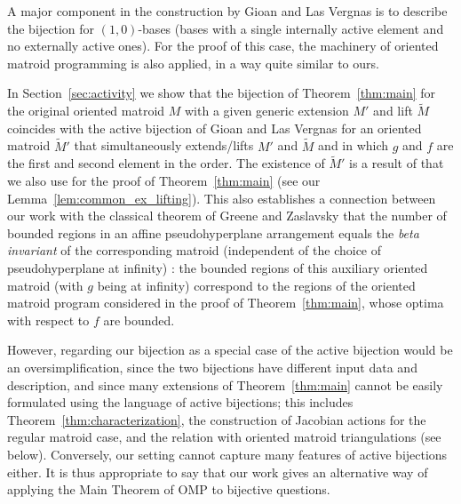 \documentclass[12pt]{amsart}
\numberwithin{equation}{section}
\theoremstyle{definition}
\newcommand{\Paco}[1]{\todo[size=\tiny,inline,color=orange!30]{#1 \\ \hfill --- P.}}
\newcommand{\Chiho}[1]{\todo[size=\tiny,inline,color=green!30]{#1 \\ \hfill --- Ch.}}
\begin{document}
A major component in the construction by Gioan and Las Vergnas is to describe  the bijection for $(1,0)$-bases (bases with a single internally active element and no externally active ones). For the proof of this case, the machinery of oriented matroid programming is also applied, in a way quite similar to ours.

In Section~\ref{sec:activity} we show that the bijection of Theorem~\ref{thm:main} for the original oriented matroid $M$ with a given generic extension $M'$ and lift $\widetilde M$ coincides with the active bijection of Gioan and Las Vergnas for an oriented matroid $\widetilde M'$ that simultaneously extends/lifts $M'$ and $\widetilde M$ and in which $g$ and $f$ are the first and second element in the order. The existence of $\widetilde M'$ is a result of \cite{Santos_book} that we also use for the proof of Theorem~\ref{thm:main} (see our Lemma~\ref{lem:common_ex_lifting}).
This also establishes a connection between our work with the classical theorem of Greene and Zaslavsky that the number of bounded regions in an affine pseudohyperplane arrangement equals the {\em beta invariant} of the corresponding matroid (independent of the choice of pseudohyperplane at infinity) \cite[Theorem D]{GZ_HPZono}: the bounded regions of this auxiliary oriented matroid (with $g$ being at infinity) correspond to the regions of the oriented matroid program considered in the proof of Theorem~\ref{thm:main}, whose optima with respect to $f$ are bounded.


However, regarding our bijection as a special case of the active bijection would be an oversimplification, since the two bijections have different input data and description, and since 
many extensions  of Theorem~\ref{thm:main} cannot be easily formulated using the language of active bijections; this includes  Theorem~\ref{thm:characterization}, the construction of Jacobian actions for the regular matroid case, and the relation with oriented matroid triangulations (see below).
Conversely, our setting cannot capture many features of active bijections either.
It is thus appropriate to say that our work gives an alternative way of applying the Main Theorem of OMP to bijective questions.

\medskip
\end{document}
